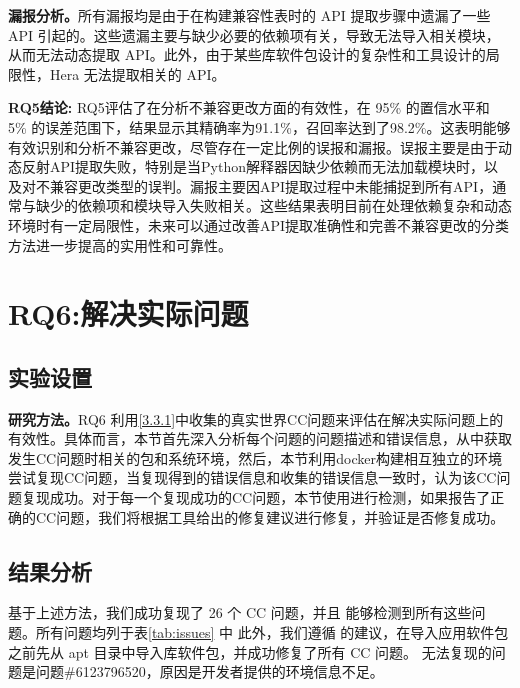 \textbf{漏报分析。}所有漏报均是由于在构建兼容性表时的 API 提取步骤中遗漏了一些 API 引起的。这些遗漏主要与缺少必要的依赖项有关，导致无法导入相关模块，从而无法动态提取 API。此外，由于某些库软件包设计的复杂性和工具设计的局限性，Hera 无法提取相关的 API。

\begin{tcolorbox}[boxrule=1pt,boxsep=1pt,left=2pt,right=2pt,top=2pt,bottom=2pt]
	\small
	\textcolor{red}{} \noindent\textbf{RQ5结论:} 
	RQ5评估了\tool{}在分析不兼容更改方面的有效性，在 95\% 的置信水平和 5\% 的误差范围下，结果显示其精确率为91.1\%，召回率达到了98.2\%。这表明\tool{}能够有效识别和分析不兼容更改，尽管存在一定比例的误报和漏报。误报主要是由于动态反射API提取失败，特别是当Python解释器因缺少依赖而无法加载模块时，以及对不兼容更改类型的误判。漏报主要因API提取过程中未能捕捉到所有API，通常与缺少的依赖项和模块导入失败相关。这些结果表明\tool{}目前在处理依赖复杂和动态环境时有一定局限性，未来可以通过改善API提取准确性和完善不兼容更改的分类方法进一步提高\tool{}的实用性和可靠性。
\end{tcolorbox} 


\section{RQ6:解决实际问题}
\subsection{实验设置}
\textbf{研究方法。}RQ6 利用\ref{3.3.1}中收集的真实世界CC问题来评估\tool{}在解决实际问题上的有效性。具体而言，本节首先深入分析每个问题的问题描述和错误信息，从中获取发生CC问题时相关的包和系统环境，然后，本节利用docker构建相互独立的环境尝试复现CC问题，当复现得到的错误信息和收集的错误信息一致时，认为该CC问题复现成功。对于每一个复现成功的CC问题，本节使用\tool{}进行检测，如果\tool{}报告了正确的CC问题，我们将根据工具给出的修复建议进行修复，并验证是否修复成功。

\subsection{结果分析}
基于上述方法，我们成功复现了 26 个 CC 问题，并且 \tool{} 能够检测到所有这些问题。所有问题均列于表\ref{tab:issues} 中
此外，我们遵循\tool{} 的建议，在导入应用软件包之前先从 apt 目录中导入库软件包，并成功修复了所有 CC 问题。
无法复现的问题是问题\#6123796520，原因是开发者提供的环境信息不足。

